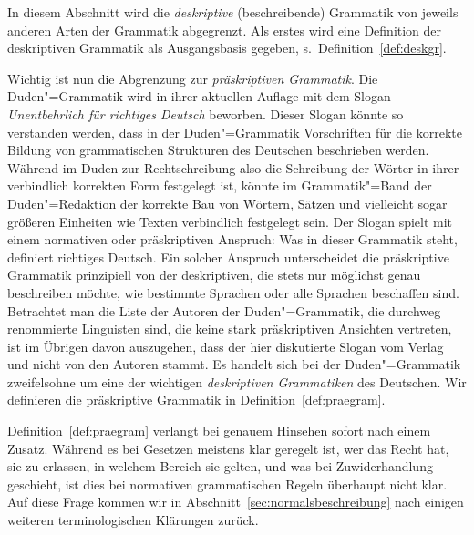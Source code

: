 In diesem Abschnitt wird die \textit{deskriptive} (beschreibende) Grammatik von jeweils anderen Arten der Grammatik abgegrenzt.
Als erstes wird eine Definition der deskriptiven Grammatik als Ausgangsbasis gegeben, s.\ Definition~\ref{def:deskgr}.




Wichtig ist nun die Abgrenzung zur \textit{präskriptiven Grammatik}.
Die Duden"=Grammatik \citep{Duden8} wird in ihrer aktuellen Auflage mit dem Slogan \textit{Unentbehrlich für richtiges Deutsch} beworben.
Dieser Slogan könnte so verstanden werden, dass in der Duden"=Grammatik Vorschriften für die korrekte Bildung von grammatischen Strukturen des Deutschen beschrieben werden.
Während im Duden zur Rechtschreibung also die Schreibung der Wörter in ihrer verbindlich korrekten Form festgelegt ist, könnte im Grammatik"=Band der Duden"=Redaktion der korrekte Bau von Wörtern, Sätzen und vielleicht sogar größeren Einheiten wie Texten verbindlich festgelegt sein.
Der Slogan spielt mit einem normativen oder präskriptiven Anspruch:
Was in dieser Grammatik steht, definiert richtiges Deutsch.
Ein solcher Anspruch unterscheidet die präskriptive Grammatik prinzipiell von der deskriptiven, die stets nur möglichst genau beschreiben möchte, wie bestimmte Sprachen oder alle Sprachen beschaffen sind.
Betrachtet man die Liste der Autoren der Duden"=Grammatik, die durchweg renommierte Linguisten sind, die keine stark präskriptiven Ansichten vertreten, ist im Übrigen davon auszugehen, dass der hier diskutierte Slogan vom Verlag und nicht von den Autoren stammt.
Es handelt sich bei der Duden"=Grammatik zweifelsohne um eine der wichtigen \textit{deskriptiven Grammatiken} des Deutschen.
Wir definieren die präskriptive Grammatik in Definition~\ref{def:praegram}.



Definition~\ref{def:praegram} verlangt bei genauem Hinsehen sofort nach einem Zusatz.
Während es bei Gesetzen meistens klar geregelt ist, wer das Recht hat, sie zu erlassen, in welchem Bereich sie gelten, und was bei Zuwiderhandlung geschieht, ist dies bei normativen grammatischen Regeln überhaupt nicht klar.
Auf diese Frage kommen wir in Abschnitt~\ref{sec:normalsbeschreibung} nach einigen weiteren terminologischen Klärungen zurück.



